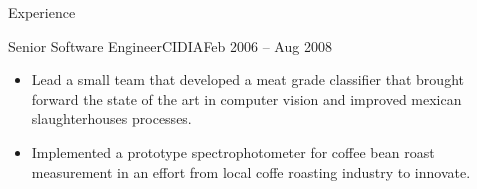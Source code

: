 \documentclass[colibri]{mcdowellcv}
\begin{document}
\begin{cvsection}{Experience}
\begin{cvsubsection}{Senior Software Engineer}{CIDIA}{Feb 2006 -- Aug 2008}
\begin{itemize}
      progress on a optical profilometry research.
    \item Lead a small team that developed a meat grade classifier that brought
      forward the state of the art in computer vision and improved mexican
      slaughterhouses processes.
    \item Implemented a prototype spectrophotometer for coffee bean roast
      measurement in an effort from local coffe roasting industry to innovate.
		\end{itemize}
	\end{cvsubsection}
\end{cvsection}
\end{document}

